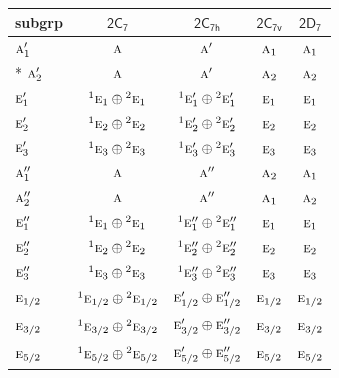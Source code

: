 \documentclass[10pt,a4paper]{article}
\numberwithin{equation}{section}
\newcommand{\grp}[1]{\mathsf{#1}}
\newcommand{\irr}[1]{\text{\normalfont\scshape #1}}
\newcommand{\conjpair}[1]{{}^{#1}}
\begin{document}
{\small\begin{longtable}{@{}lcccc@{}}\toprule
subgrp & \href{2C7.pdf}{$\grp{2C_{7}}$} & \href{2C7h.pdf}{$\grp{2C_{7h}}$} & \href{2C7v.pdf}{$\grp{2C_{7v}}$} & \href{2D7.pdf}{$\grp{2D_{7}}$}\\\midrule\endhead
\bottomrule\endfoot\endlastfoot
$\irr{a}_{1}'$ & $\irr{a}$ & $\irr{a}'$ & $\irr{a}_{1}$ & $\irr{a}_{1}$\\*
$\irr{a}_{2}'$ & $\irr{a}$ & $\irr{a}'$ & $\irr{a}_{2}$ & $\irr{a}_{2}$\\
$\irr{e}_{1}'$ & $\conjpair{1}\irr{e}_{1}\oplus \conjpair{2}\irr{e}_{1}$ & $\conjpair{1}\irr{e}_{1}'\oplus \conjpair{2}\irr{e}_{1}'$ & $\irr{e}_{1}$ & $\irr{e}_{1}$\\
$\irr{e}_{2}'$ & $\conjpair{1}\irr{e}_{2}\oplus \conjpair{2}\irr{e}_{2}$ & $\conjpair{1}\irr{e}_{2}'\oplus \conjpair{2}\irr{e}_{2}'$ & $\irr{e}_{2}$ & $\irr{e}_{2}$\\
$\irr{e}_{3}'$ & $\conjpair{1}\irr{e}_{3}\oplus \conjpair{2}\irr{e}_{3}$ & $\conjpair{1}\irr{e}_{3}'\oplus \conjpair{2}\irr{e}_{3}'$ & $\irr{e}_{3}$ & $\irr{e}_{3}$\\
$\irr{a}_{1}''$ & $\irr{a}$ & $\irr{a}''$ & $\irr{a}_{2}$ & $\irr{a}_{1}$\\
$\irr{a}_{2}''$ & $\irr{a}$ & $\irr{a}''$ & $\irr{a}_{1}$ & $\irr{a}_{2}$\\
$\irr{e}_{1}''$ & $\conjpair{1}\irr{e}_{1}\oplus \conjpair{2}\irr{e}_{1}$ & $\conjpair{1}\irr{e}_{1}''\oplus \conjpair{2}\irr{e}_{1}''$ & $\irr{e}_{1}$ & $\irr{e}_{1}$\\
$\irr{e}_{2}''$ & $\conjpair{1}\irr{e}_{2}\oplus \conjpair{2}\irr{e}_{2}$ & $\conjpair{1}\irr{e}_{2}''\oplus \conjpair{2}\irr{e}_{2}''$ & $\irr{e}_{2}$ & $\irr{e}_{2}$\\
$\irr{e}_{3}''$ & $\conjpair{1}\irr{e}_{3}\oplus \conjpair{2}\irr{e}_{3}$ & $\conjpair{1}\irr{e}_{3}''\oplus \conjpair{2}\irr{e}_{3}''$ & $\irr{e}_{3}$ & $\irr{e}_{3}$\\
$\irr{e}_{1/2}$ & $\conjpair{1}\irr{e}_{1/2}\oplus \conjpair{2}\irr{e}_{1/2}$ & $\irr{e}_{1/2}'\oplus \irr{e}_{1/2}''$ & $\irr{e}_{1/2}$ & $\irr{e}_{1/2}$\\
$\irr{e}_{3/2}$ & $\conjpair{1}\irr{e}_{3/2}\oplus \conjpair{2}\irr{e}_{3/2}$ & $\irr{e}_{3/2}'\oplus \irr{e}_{3/2}''$ & $\irr{e}_{3/2}$ & $\irr{e}_{3/2}$\\
$\irr{e}_{5/2}$ & $\conjpair{1}\irr{e}_{5/2}\oplus \conjpair{2}\irr{e}_{5/2}$ & $\irr{e}_{5/2}'\oplus \irr{e}_{5/2}''$ & $\irr{e}_{5/2}$ & $\irr{e}_{5/2}$\\

\end{longtable}}
\end{document}
